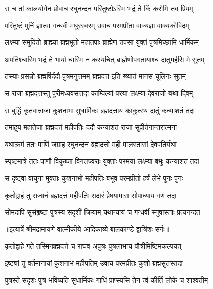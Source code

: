 \twolineshloka
{स च तां कालयोगेन प्रोवाच रघुनन्दन}
{परितुष्टोऽस्मि भद्रं ते किं करोमि तव प्रियम्} %

\twolineshloka
{परितुष्टं मुनिं ज्ञात्वा गन्धर्वी मधुरस्वरम्}
{उवाच परमप्रीता वाक्यज्ञा वाक्यकोविदम्} %

\twolineshloka
{लक्ष्म्या समुदितो ब्राह्म्या ब्रह्मभूतो महातपाः}
{ब्राह्मेण तपसा युक्तं पुत्रमिच्छामि धार्मिकम्} %

\twolineshloka
{अपतिश्चास्मि भद्रं ते भार्या चास्मि न कस्यचित्}
{ब्राह्मेणोपगतायाश्च दातुमर्हसि मे सुतम्} %

\twolineshloka
{तस्याः प्रसन्नो ब्रह्मर्षिर्ददौ पुत्रमनुत्तमम्}
{ब्रह्मदत्त इति ख्यातं मानसं चूलिनः सुतम्} %

\twolineshloka
{स राजा ब्रह्मदत्तस्तु पुरीमध्यवसत्तदा}
{काम्पिल्यां परया लक्ष्म्या देवराजो यथा दिवम्} %

\twolineshloka
{स बुद्धिं कृतवान्राजा कुशनाभः सुधार्मिकः}
{ब्रह्मदत्ताय काकुत्स्थ दातुं कन्याशतं तदा} %

\twolineshloka
{तमाहूय महातेजा ब्रह्मदत्तं महीपतिः}
{ददौ कन्याशतं राजा सुप्रीतेनान्तरात्मना} %

\twolineshloka
{यथाक्रमं ततः पाणिं जग्राह रघुनन्दन}
{ब्रह्मदत्तो मही पालस्तासां देवपतिर्यथा} %

\twolineshloka
{स्पृष्टमात्रे ततः पाणौ विकुब्जा विगतज्वराः}
{युक्ताः परमया लक्ष्म्या बभुः कन्याशतं तदा} %

\twolineshloka
{स दृष्ट्वा वायुना मुक्ताः कुशनाभो महीपतिः}
{बभूव परमप्रीतो हर्षं लेभे पुनः पुनः} %

\twolineshloka
{कृतोद्वाहं तु राजानं ब्रह्मदत्तं महीपतिः}
{सदारं प्रेषयामास सोपाध्याय गणं तदा} %

\twolineshloka
{सोमदापि सुसंहृष्टा पुत्रस्य सदृशीं क्रियाम्}
{यथान्यायं च गन्धर्वी स्नुषास्ताः प्रत्यनन्दत} %


{॥इत्यार्षे श्रीमद्रामायणे वाल्मीकीये आदिकाव्ये बालकाण्डे द्वात्रिंशः सर्गः॥}


\twolineshloka
{कृतोद्वाहे गते तस्मिन्ब्रह्मदत्ते च राघव}
{अपुत्रः पुत्रलाभाय पौत्रीमिष्टिमकल्पयत्} %

\twolineshloka
{इष्ट्यां तु वर्तमानायां कुशनाभं महीपतिम्}
{उवाच परमप्रीतः कुशो ब्रह्मसुतस्तदा} %

\twolineshloka
{पुत्रस्ते सदृशः पुत्र भविष्यति सुधार्मिकः}
{गाधिं प्राप्स्यसि तेन त्वं कीर्तिं लोके च शाश्वतीम्} %

